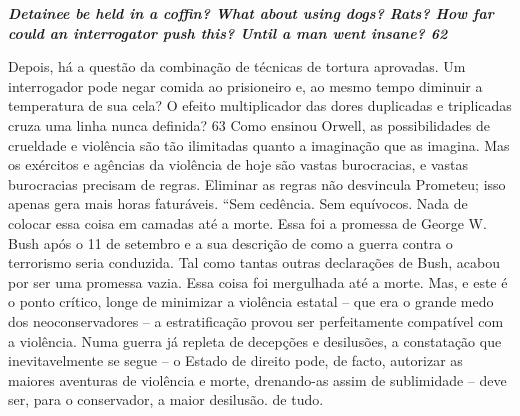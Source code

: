  
\par
 

 \textbf{\textit{Detainee be held in a coffin? What about using dogs? Rats? How far could an interrogator push this? Until a man went insane? 62} }  
 
 
\par
 
Depois, há a questão da combinação de técnicas de tortura aprovadas. Um interrogador pode negar comida ao prisioneiro e, ao mesmo tempo diminuir a temperatura de sua cela? O efeito multiplicador das dores duplicadas e triplicadas cruza uma linha nunca definida?
 {\color{blue} 63}  
Como ensinou Orwell, as possibilidades de crueldade e violência são tão ilimitadas quanto a imaginação que as imagina. Mas os exércitos e agências da violência de hoje são vastas burocracias, e vastas burocracias precisam de regras. Eliminar as regras não desvincula Prometeu; isso apenas gera mais horas faturáveis. “Sem cedência. Sem equívocos. Nada de colocar essa coisa em camadas até a morte. Essa foi a promessa de George W. Bush após o 11 de setembro e a sua descrição de como a guerra contra o terrorismo seria conduzida. Tal como tantas outras declarações de Bush, acabou por ser uma promessa vazia. Essa coisa foi mergulhada até a morte. Mas, e este é o ponto crítico, longe de minimizar a violência estatal – que era o grande medo dos neoconservadores – a estratificação provou ser perfeitamente compatível com a violência. Numa guerra já repleta de decepções e desilusões, a constatação que inevitavelmente se segue – o Estado de direito pode, de facto, autorizar as maiores aventuras de violência e morte, drenando-as assim de sublimidade – deve ser, para o conservador, a maior desilusão. de tudo.
 
\par
 
